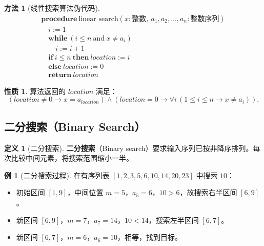 \documentclass[UTF8,11pt,a4paper]{ctexbook}   %
\theoremstyle{definition}
\newtheorem{definition}{定义}[section]
\newtheorem{example}{例}[section]
\newtheorem{property}{性质}[section]
\newtheorem{method}{方法}[section]
\begin{document}
\begin{method}[线性搜索算法伪代码]
\[
\begin{array}{l}
\textbf{procedure}\ \text{linear search}(x: \text{整数},\ a_1, a_2, \ldots, a_n: \text{整数序列})\\
\quad i := 1\\
\quad \textbf{while}\ (i \leq n\ \text{and}\ x \neq a_i)\\
\quad \quad i := i + 1\\
\quad \textbf{if}\ i \leq n\ \textbf{then}\ location := i\\
\quad \textbf{else}\ location := 0\\
\quad \textbf{return}\ location
\end{array}
\]
\end{method}

\begin{property}
算法返回的 $location$ 满足：
\[
(location \neq 0 \to x = a_{location}) \land (location = 0 \to \forall i\,(1 \leq i \leq n \to x \neq a_i)).
\]
\end{property}

\subsection{二分搜索（Binary Search）}

\begin{definition}[二分搜索]
\textbf{二分搜索}（Binary search）要求输入序列已按非降序排列。每次比较中间元素，将搜索范围缩小一半。
\end{definition}

\begin{example}[二分搜索过程]
在有序列表 $[1,2,3,5,6,10,14,20,23]$ 中搜索 $10$：
\begin{itemize}
    \item 初始区间 $[1,9]$，中间位置 $m=5$，$a_5=6$，$10>6$，故搜索右半区间 $[6,9]$。
    \item 新区间 $[6,9]$，$m=7$，$a_7=14$，$10<14$，搜索左半区间 $[6,7]$。
    \item 新区间 $[6,7]$，$m=6$，$a_6=10$，相等，找到目标。
\end{itemize}
\end{example}
\end{document}
